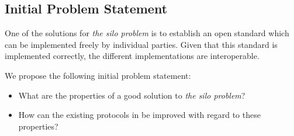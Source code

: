 \subsection{Initial Problem Statement}\label{subsec:initial_problem_statement}
One of the solutions for \textit{the silo problem} is to establish an open standard which can be implemented freely by individual parties.
Given that this standard is implemented correctly, the different implementations are interoperable.

We propose the following initial problem statement:
\begin{itemize}
    \item What are the properties of a good solution to \textit{the silo problem}?
    \item How can the existing protocols in \cite{twitter_comms_protocol_comparison} be improved with regard to these properties?
\end{itemize}